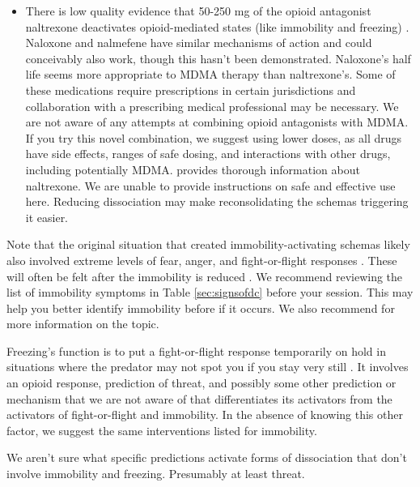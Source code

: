 \documentclass[12pt,letterpaper]{book}
\begin{document}
\begin{itemize}
	\item There is low quality evidence that 50-250 mg of the opioid antagonist naltrexone deactivates opioid-mediated states (like immobility and freezing) \cite{escamilla2023treatment}. Naloxone and nalmefene have similar mechanisms of action and could conceivably also work, though this hasn't been demonstrated. Naloxone's half life seems more appropriate to MDMA therapy than naltrexone's. Some of these medications require prescriptions in certain jurisdictions and collaboration with a prescribing medical professional may be necessary. We are not aware of any attempts at combining opioid antagonists with MDMA. If you try this novel combination, we suggest using lower doses, as all drugs have side effects, ranges of safe dosing, and interactions with other drugs, including potentially MDMA. \textcite{naltrexoneInfo} provides thorough information about naltrexone. We are unable to provide instructions on safe and effective use here. Reducing dissociation may make reconsolidating the schemas triggering it easier.
\end{itemize}
Note that the original situation that created immobility-activating schemas likely also involved extreme levels of fear, anger, and fight-or-flight responses \cite{kozlowskaDefenseCascade}. These will often be felt after the immobility is reduced \cite{razviPSIP}. We recommend reviewing the list of immobility symptoms in Table \ref{sec:signsofdc} before your session. This may help you better identify immobility before if it occurs. We also recommend \textcite{razviDissociation} for more information on the topic.

Freezing's function is to put a fight-or-flight response temporarily on hold in situations where the predator may not spot you if you stay very still \cite{kozlowskaDefenseCascade}. It involves an opioid response, prediction of threat, and possibly some other prediction or mechanism that we are not aware of that differentiates its activators from the activators of fight-or-flight and immobility. In the absence of knowing this other factor, we suggest the same interventions listed for immobility.

We aren't sure what specific predictions activate forms of dissociation that don't involve immobility and freezing. Presumably at least threat.
\end{document}
